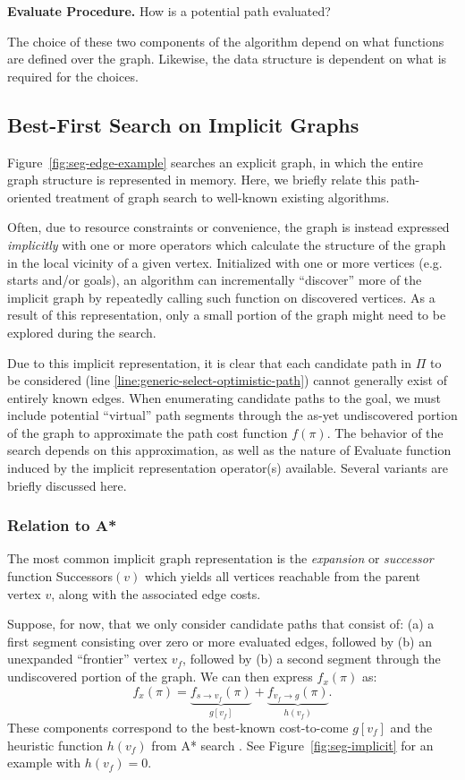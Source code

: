 \textbf{{\sc Evaluate} Procedure.}
How is a potential path evaluated?

The choice of these two components of the algorithm depend on what
functions are defined over the graph.
Likewise, the data structure is dependent on what is required
for the choices.

\subsection{Best-First Search on Implicit Graphs}
\label{sec:implicit}

Figure~\ref{fig:seg-edge-example} searches an explicit graph,
in which the entire graph structure is represented in memory.
Here, we briefly relate this path-oriented treatment of graph search
to well-known existing algorithms.

Often, due to resource constraints or convenience,
the graph is instead expressed \emph{implicitly}
with one or more operators which calculate the structure of the graph
in the local vicinity of a given vertex.
Initialized with one or more vertices (e.g. starts and/or goals),
an algorithm can incrementally ``discover'' more of the implicit
graph by repeatedly calling such function on discovered vertices.
As a result of this representation,
only a small portion of the graph might need to be explored
during the search.

Due to this implicit representation,
it is clear that each candidate path in $\Pi$ to be considered
(line \ref{line:generic-select-optimistic-path})
cannot generally exist of entirely known edges.
When enumerating candidate paths to the goal,
we must include potential ``virtual'' path segments
through the as-yet undiscovered portion of the graph
to approximate the path cost function $f(\pi)$.
The behavior of the search depends on this approximation,
as well as the nature of {\sc Evaluate} function induced by
the implicit representation operator(s) available.
Several variants are briefly discussed here.

\subsubsection{Relation to A*}

The most common implicit graph representation
is the \emph{expansion} or \emph{successor} function {\sc Successors}$(v)$
which yields all vertices reachable from the parent vertex $v$,
along with the associated edge costs.

Suppose, for now, that we only consider candidate paths that consist of:
(a) a first segment consisting over zero or more evaluated edges,
followed by
(b) an unexpanded ``frontier'' vertex $v_f$, followed by
(b) a second segment through the undiscovered portion of the graph.
We can then express $f_x(\pi)$ as:
\begin{equation}
   f_x(\pi)
   = \underbrace{f_{s \rightarrow v_f}(\pi)}_{g[v_f]}
   + \underbrace{f_{v_f \rightarrow g}(\pi)}_{h(v_f)}.
\end{equation}
These components correspond to the best-known cost-to-come $g[v_f]$
and the heuristic function $h(v_f)$ from A* search \cite{hart1968astar}.
See Figure~\ref{fig:seg-implicit} for an example with $h(v_f)=0$.

